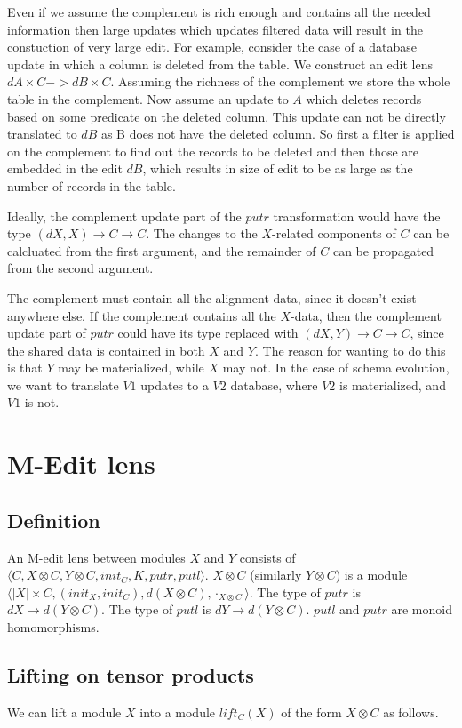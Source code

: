 \documentclass[a4paper,10pt]{article}
\begin{document}
Even if we assume the complement is rich enough and contains all the needed information then large updates which updates filtered data will result in the constuction of very large edit. For example, consider the case of a database update in which a column is deleted from the table. We construct an edit lens $dA \times C -> dB \times C$. Assuming the richness of the complement we store the whole table in the complement. Now assume an update to $A$ which deletes records based on some predicate on the deleted column. This update can not be directly translated to $dB$ as B does not have the deleted column. So first a filter is applied on the complement to find out the records to be deleted and then those are embedded in the edit $dB$, which results in size of edit to be as large as the number of records in the table.

Ideally, the complement update part of the $putr$ transformation would have the type $(dX, X) \to C \to C$. The changes to the $X$-related components of $C$ can be calcluated from the first argument, and the remainder of $C$ can be propagated from the second argument. 

The complement must contain all the alignment data, since it doesn't exist anywhere else. If the complement contains all the $X$-data, then the complement update part of $putr$ could have its type replaced with $(dX, Y) \to C \to C$, since the shared data is contained in both $X$ and $Y$. The reason for wanting to do this is that $Y$ may be materialized, while $X$ may not. 
In the case of schema evolution, we want to translate $V1$ updates to a $V2$ database, where $V2$ is materialized, and $V1$ is not.

\section{M-Edit lens}

\subsection{Definition}
An M-edit lens between modules $X$ and $Y$ consists of $\langle C, X \otimes C, Y \otimes C, init_C, K, putr, putl \rangle$. $X \otimes C$ (similarly $Y \otimes C$) is a module $\langle |X| \times C, (init_X, init_C), d(X \otimes C), \cdot_{X \otimes C} \rangle$. The type of $putr$ is $dX \to d(Y \otimes C)$. The type of $putl$ is $dY \to d(Y \otimes C)$. $putl$ and $putr$ are monoid homomorphisms.

\subsection{Lifting on tensor products}
We can lift a module $X$ into a module $lift_C(X)$ of the form $X \otimes C$ as follows. 
\end{document}
